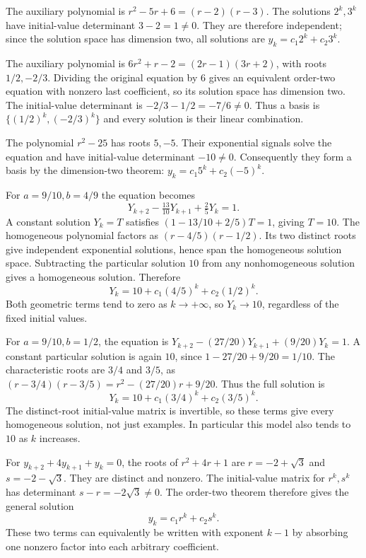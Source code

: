The auxiliary polynomial is $r^2-5r+6=(r-2)(r-3)$.
The solutions $2^k,3^k$ have initial-value determinant $3-2=1\ne0$.
They are therefore independent; since the solution space has dimension two,
all solutions are $y_k=c_1 2^k+c_2 3^k$.

The auxiliary polynomial is $6r^2+r-2=(2r-1)(3r+2)$, with roots
$1/2,-2/3$. Dividing the original equation by $6$ gives an equivalent
order-two equation with nonzero last coefficient, so its solution space has
dimension two. The initial-value determinant is $-2/3-1/2=-7/6\ne0$.
Thus a basis is $\{(1/2)^k,(-2/3)^k\}$ and every solution is their linear combination.

The polynomial $r^2-25$ has roots $5,-5$. Their exponential signals solve
the equation and have initial-value determinant $-10\ne0$.
Consequently they form a basis by the dimension-two theorem:
$y_k=c_1 5^k+c_2(-5)^k$.

For $a=9/10,b=4/9$ the equation becomes
\[
 Y_{k+2}-\tfrac{13}{10}Y_{k+1}+\tfrac25Y_k=1.
\]
A constant solution $Y_k=T$ satisfies $(1-13/10+2/5)T=1$, giving $T=10$.
The homogeneous polynomial factors as $(r-4/5)(r-1/2)$.
Its two distinct roots give independent exponential solutions, hence span
the homogeneous solution space. Subtracting the particular solution $10$
from any nonhomogeneous solution gives a homogeneous solution. Therefore
\[
 Y_k=10+c_1(4/5)^k+c_2(1/2)^k.
\]
Both geometric terms tend to zero as $k\to+\infty$, so $Y_k\to10$,
regardless of the fixed initial values.

For $a=9/10,b=1/2$, the equation is
$Y_{k+2}-(27/20)Y_{k+1}+(9/20)Y_k=1$.
A constant particular solution is again $10$, since $1-27/20+9/20=1/10$.
The characteristic roots are $3/4$ and $3/5$, as
$(r-3/4)(r-3/5)=r^2-(27/20)r+9/20$.
Thus the full solution is
\[
 Y_k=10+c_1(3/4)^k+c_2(3/5)^k.
\]
The distinct-root initial-value matrix is invertible, so these terms give
every homogeneous solution, not just examples. In particular this model
also tends to $10$ as $k$ increases.

For $y_{k+2}+4y_{k+1}+y_k=0$, the roots of $r^2+4r+1$ are
$r=-2+\sqrt3$ and $s=-2-\sqrt3$. They are distinct and nonzero.
The initial-value matrix for $r^k,s^k$ has determinant $s-r=-2\sqrt3\ne0$.
The order-two theorem therefore gives the general solution
\[
 y_k=c_1r^k+c_2s^k.
\]
These two terms can equivalently be written with exponent $k-1$ by absorbing
one nonzero factor into each arbitrary coefficient.

